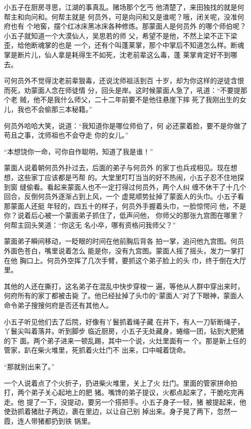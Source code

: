 小五子在厨房寻思，江湖的事真乱。赌场那个乞丐
他清楚了，来田独找的就是何帮主和向问和。何帮主就是
何员外，可是向问和又是谁呢？哦，闭关呢，没准何府也有
个地窖，摆个红冰床黑冰床各种修炼。那蒙面人是何员外
的哪个师伯呢？小五子就知道一个大漠仙人，吴思若的师
父，希望不是他，不然上梁不正下梁歪，给他断魂掌的也是
一个，还有个叫蓬莱掌，那个中掌后不知道怎么样。断魂
掌是断片儿，仙人拿是耗得生不如死，沈老前辈这么毒，蓬
莱掌肯定好不到哪去。

可何员外不觉得沈老前辈狠毒，还说沈师祖活到百
十岁，却为你这样的逆徒含恨而死，劝蒙面人念在师徒情
分，回头是岸。这时候蒙面人急了，吼道：“不要提那个老
贼，他不是我什么师父，二十二年前要不是他往悬崖下摔
死了我刚出生的女儿，我也不会偷那三本秘籍。”

何员外哈哈大笑，说道：“我知道你是哪位师伯了，何
必还蒙着脸，要不是你做了苟且之事，沈师祖也不会夺走
你的女儿。”

“本想饶你一命，可你自作聪明，知道了我是谁！”

蒙面人说着朝何员外扑过去，后面的弟子与何员外
的家丁也兵戎相见。现在想想，这些家丁应该都是丐帮
的。大堂里叮叮当当的好不热闹，小五子忍不住地探到窗
缝偷看。看起来蒙面人也不一定打得过何员外，两个人纠
缠不休干了十几个回合，反倒何员外逐渐占到上风，一个
虚晃顺势扯掉了蒙面人的头巾。小五子看那蒙面人还挺
年轻的，四五十的样子，何员外手握着头巾，一脸惊愕问
他，不是你？说着后心被一个蒙面弟子抓住了，低声问他，
你师父的那张九宫图在哪里？何帮主回头笑道：“你这无
名小卒，哪有资格问我师父？”

蒙面弟子瞬间移动，一眨眼的时间在他前胸后背各
拍一掌，追问他九宫图。何员外面色苍白，嘴里说着怎么
能是你，没有九宫图。蒙面人摇了摇头，发力一掌打在他
胸口上。何员外空挥了几次手臂，要抓这个弟子脸上的头
巾，终于倒在大厅里。

其他的人还在撕打，这名弟子在混乱中快步穿梭一
遍，等他从人群中穿出来时，何府所有的家丁都被击毙
了。他已经扯掉了头巾的“蒙面人”对了下眼神，蒙面人
命令弟子搜搜何府是否还有其他人。

小五子听见他们去了后院，好像有丫鬟抓着绳子藏
在井下，有人一刀斩断绳子，丫鬟尖叫着落井。听到脚步
临近厨房，小五子无处藏身，蜷缩一团，钻到大肥猪的下
面。两个弟子进来一顿乱踢，其中一个说，火灶里面有一
个。那是新上任的管家，趴在柴火堆里，死抓着火灶门不
出来，口中喊着饶命。

“那就别出来了。”

一个人说着点了个火折子，扔进柴火堆里，关上了火
灶门。里面的管家拼命拍打，两个弟子关心起地上的肥
猪。嘴馋的弟子提议，火都点起来了，干脆吃完再走。他
提了一下，没提动，要另一个搭把手。小五子身子一轻，猪
被提起来，他使劲抓着猪肚子两边，裹在里边，以让自己别
掉出来。身子晃了两下，忽然一霞，连人带猪都扔到铁
锅里。

